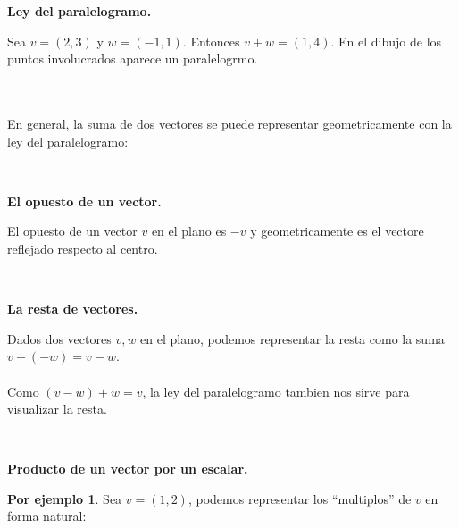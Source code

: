 \documentclass{article}
\theoremstyle{definition}
\theoremstyle{definition}
\newtheorem*{ej}{Por ejemplo}
\theoremstyle{remark}
\begin{document}
\begin{center}
\textbf{Ley del paralelogramo.}
\end{center}
Sea $v=(2,3)$ y $w=(-1,1)$. Entonces $v+w=(1,4)$. En el dibujo de los puntos involucrados aparece un paralelogrmo.
\begin{figure}[h]
\centering
\def\svgwidth{0.75\textwidth}

\end{figure}\\ \pagebreak \\
En general, la suma de dos vectores se puede representar geometricamente con la ley del paralelogramo: 
\begin{figure}[h]
\centering
\def\svgwidth{0.45\textwidth}

\end{figure}\\
\begin{center}
\textbf{El opuesto de un vector.}
\end{center}
El opuesto de un vector $v$ en el plano es $-v$ y geometricamente es el vectore reflejado respecto al centro.
\begin{figure}[h]
\centering
\def\svgwidth{0.45\textwidth}

\end{figure}\\ \pagebreak
\begin{center}
\textbf{La resta de vectores.}
\end{center}
Dados dos vectores $v,w$ en el plano, podemos representar la resta como la suma $v+(-w)=v-w$.\\\\ 
Como $(v-w)+w=v$, la ley del paralelogramo tambien nos sirve para visualizar la resta.
\begin{figure}[h]
\centering
\def\svgwidth{0.45\textwidth}

\end{figure}\\
\begin{center}
\textbf{Producto de un vector por un escalar.}
\end{center}
\begin{ej}
  Sea $v=(1,2)$, podemos representar los ``multiplos'' de $v$ en forma natural: 
\end{ej}
\begin{figure}[h]
\centering
\def\svgwidth{0.45\textwidth}

\end{figure}
\end{document}
